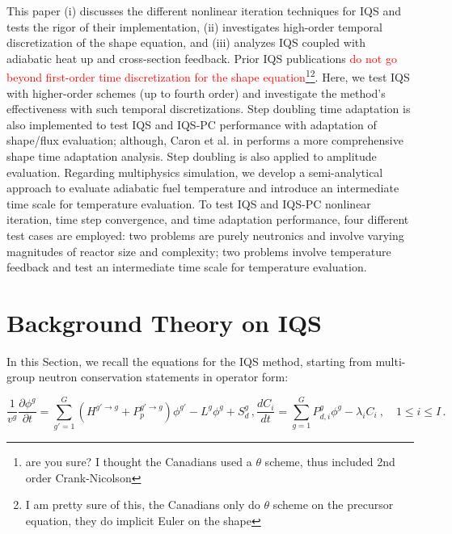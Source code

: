 \documentclass{elsarticle}
\newcommand{\iqspc}{IQS-PC\xspace}
\newcommand{\be}{\begin{equation}}
\newcommand{\ee}{\end{equation}}
\newcommand{\tcr}[1]{\textcolor{red}{#1}}
\newcommand{\tcb}[1]{\textcolor{blue}{#1}}
\begin{document}
This paper (i) discusses the different nonlinear iteration techniques for IQS and tests the rigor of their implementation, (ii) investigates high-order temporal discretization of the shape equation, and (iii) analyzes IQS coupled with adiabatic heat up and cross-section feedback. Prior IQS publications \tcr{do not go beyond first-order time discretization for the shape equation\footnote{are you sure? I thought the Canadians used a $\theta$ scheme, thus included 2nd order Crank-Nicolson}}\tcb{\footnote{I am pretty sure of this, the Canadians only do $\theta$ scheme on the precursor equation, they do implicit Euler on the shape}}. Here, we test IQS with higher-order schemes (up to fourth order) and investigate the method's effectiveness with such temporal discretizations. Step doubling time adaptation is also implemented to test IQS and \iqspc performance with adaptation of shape/flux evaluation; although, Caron et al. in \cite{caron2017} performs a more comprehensive shape time adaptation analysis. Step doubling is also applied to amplitude evaluation. Regarding multiphysics simulation, we develop a semi-analytical approach to evaluate adiabatic fuel temperature and introduce an intermediate time scale for temperature evaluation. To test IQS and \iqspc nonlinear iteration, time step convergence, and time adaptation performance, four different test cases are employed: two problems are purely neutronics and involve varying magnitudes of reactor size and complexity; two problems involve temperature feedback and test an intermediate time scale for temperature evaluation.

\section{Background Theory on IQS}

In this Section, we recall the equations for the IQS method, starting from multi-group neutron conservation statements in operator form:

\begin{subequations}
\be
\frac{1}{v^g}\frac{\partial \phi^g}{\partial t} = \sum_{g'=1}^G \left(H^{g'\to g} + P_p^{g' \to g} \right) \phi^{g'} - L^g\phi^g + S_{d}^g \,,
\label{eq:flux}
\ee 
\be
\frac{dC_i}{dt} = \sum_{g=1}^G P_{d,i}^g \phi^{g} - \lambda_i C_i \ , \quad 1 \le i \le I  \,.
\label{eq:precursor}
\ee
\end{subequations}
\end{document}
